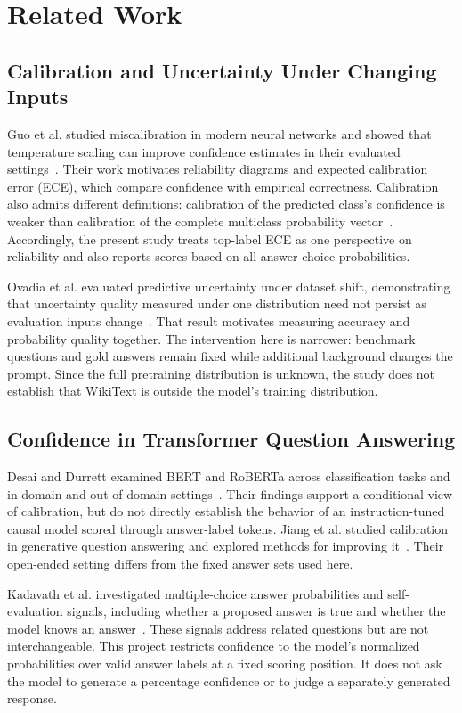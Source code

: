 \documentclass[conference]{IEEEtran}
\begin{document}
\section{Related Work}
\subsection{Calibration and Uncertainty Under Changing Inputs}
Guo et al. studied miscalibration in modern neural networks and showed that temperature scaling can improve confidence estimates in their evaluated settings~\cite{guo2017}. Their work motivates reliability diagrams and expected calibration error (ECE), which compare confidence with empirical correctness. Calibration also admits different definitions: calibration of the predicted class's confidence is weaker than calibration of the complete multiclass probability vector~\cite{vaicenavicius2019}. Accordingly, the present study treats top-label ECE as one perspective on reliability and also reports scores based on all answer-choice probabilities.

Ovadia et al. evaluated predictive uncertainty under dataset shift, demonstrating that uncertainty quality measured under one distribution need not persist as evaluation inputs change~\cite{ovadia2019}. That result motivates measuring accuracy and probability quality together. The intervention here is narrower: benchmark questions and gold answers remain fixed while additional background changes the prompt. Since the full pretraining distribution is unknown, the study does not establish that WikiText is outside the model's training distribution.

\subsection{Confidence in Transformer Question Answering}
Desai and Durrett examined BERT and RoBERTa across classification tasks and in-domain and out-of-domain settings~\cite{desai2020}. Their findings support a conditional view of calibration, but do not directly establish the behavior of an instruction-tuned causal model scored through answer-label tokens. Jiang et al. studied calibration in generative question answering and explored methods for improving it~\cite{jiang2021}. Their open-ended setting differs from the fixed answer sets used here.

Kadavath et al. investigated multiple-choice answer probabilities and self-evaluation signals, including whether a proposed answer is true and whether the model knows an answer~\cite{kadavath2022}. These signals address related questions but are not interchangeable. This project restricts confidence to the model's normalized probabilities over valid answer labels at a fixed scoring position. It does not ask the model to generate a percentage confidence or to judge a separately generated response.
\end{document}
